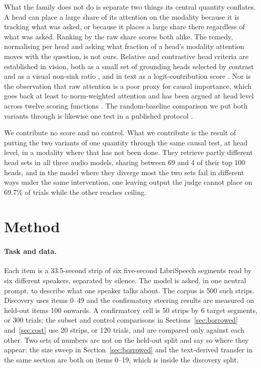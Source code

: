 \documentclass[11pt]{article}
\begin{document}
What the family does not do is separate two things its central quantity
conflates. A head can place a large share of its attention on the modality
because it is tracking what was asked, or because it places a large share there
regardless of what was asked. Ranking by the raw share scores both alike. The
remedy, normalising per head and asking what fraction of a head's modality
attention moves with the question, is not ours. Relative and contrastive head
criteria are established in vision, both as a small set of grounding heads
selected by contrast \citep{contrastiveheads2026} and as a
visual non-sink ratio \citep{kang2025sink}, and in text as a logit-contribution
score \citep{locos2026}. Nor is the observation that raw attention is a
poor proxy for causal importance, which goes back at least to norm-weighted
attention \citep{kobayashi2020attention} and has been argued at head level across
twelve scoring functions \citep{inactiveheads2026}. The random-baseline comparison
we put both variants through is likewise one test in a published protocol
\citep{unittests2026}.

We contribute no score and no control. What we contribute is the result of
putting the two variants of one quantity through the same causal test, at head
level, in a modality where that has not been done. They retrieve partly different
head sets in all three audio models, sharing between 69 and 4 of their top 100
heads, and in the model where they diverge most the two sets fail in different
ways under the same intervention, one leaving output the judge cannot place on
69.7\% of trials while the other reaches ceiling.

\section{Method}
\label{sec:method}

\paragraph{Task and data.} Each item is a 33.5-second strip of six five-second
LibriSpeech segments read by six different speakers, separated by silence. The
model is asked, in one neutral prompt, to describe what one speaker talks about.
The corpus is 500 such strips. Discovery uses items 0--49 and the confirmatory
steering results are measured on held-out items 100 onwards. A confirmatory cell
is 50 strips by 6 target segments, or 300 trials; the subset and control
comparisons in Sections~\ref{sec:borrowed} and~\ref{sec:cost} use 20 strips, or
120 trials, and are compared only against each other. Two sets of numbers are not on the
held-out split and say so where they appear: the size sweep in
Section~\ref{sec:borrowed} and the text-derived transfer in the same section are
both on items 0--19, which is inside the discovery split.
\end{document}
